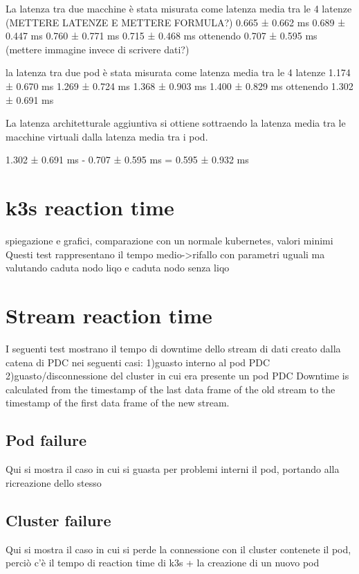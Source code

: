 La latenza tra due macchine è stata misurata come latenza media tra le 4 latenze (METTERE LATENZE E METTERE FORMULA?)
0.665 ± 0.662 ms 
0.689 ± 0.447 ms 
0.760 ± 0.771 ms 
0.715 ± 0.468 ms
ottenendo 0.707 ± 0.595 ms (mettere immagine invece di scrivere dati?)

la latenza tra due pod è stata misurata come latenza media tra le 4 latenze
1.174 ± 0.670 ms
1.269 ± 0.724 ms
1.368 ± 0.903 ms
1.400 ± 0.829 ms
ottenendo 1.302 ± 0.691 ms

La latenza architetturale aggiuntiva si ottiene sottraendo la latenza media tra le macchine virtuali dalla latenza media tra i pod.

1.302 ± 0.691 ms - 0.707 ± 0.595 ms = 0.595 ± 0.932 ms

\section{k3s reaction time}
spiegazione e grafici, comparazione con un normale kubernetes, valori minimi
Questi test rappresentano il tempo medio->rifallo con parametri uguali ma valutando caduta nodo liqo e caduta nodo senza liqo

\section{Stream reaction time}
I seguenti test mostrano il tempo di downtime dello stream di dati creato dalla catena di PDC nei seguenti casi:
1)guasto interno al pod PDC
2)guasto/disconnessione del cluster in cui era presente un pod PDC 
Downtime is calculated from the timestamp of the last data frame of the old stream to the timestamp of the first data frame of the new stream.

\subsection{Pod failure}
Qui si mostra il caso in cui si guasta per problemi interni il pod, portando alla ricreazione dello stesso 
\subsection{Cluster failure}
Qui si mostra il caso in cui si perde la connessione con il cluster contenete il pod, perciò c'è il tempo di reaction time di k3s + la creazione di un nuovo pod


